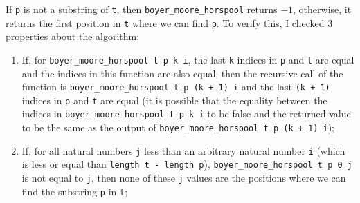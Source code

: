 If \texttt{p} is not a substring of \texttt{t}, then \texttt{boyer\_moore\_horspool} returns \(-1\), otherwise, it returns the first position in \texttt{t} where we can find \texttt{p}. To verify this, I checked \(3\) properties about the algorithm:
\begin{enumerate}
\item If, for \texttt{boyer\_moore\_horspool t p k i}, the last \texttt{k} indices in \texttt{p} and \texttt{t} are equal and the indices in this function are also equal, then the recursive call of the function is \texttt{boyer\_moore\_horspool t p (k + 1) i} and the last \texttt{(k + 1)} indices in \texttt{p} and \texttt{t} are equal (it is possible that the equality between the indices in \texttt{boyer\_moore\_horspool t p k i} to be false and the returned value to be the same as the output of \texttt{boyer\_moore\_horspool t p (k + 1) i});
\item If, for all natural numbers \texttt{j} less than an arbitrary natural number \texttt{i} (which is less or equal than \texttt{length t - length p}), \texttt{boyer\_moore\_horspool t p 0 j} is not equal to \texttt{j}, then none of these \texttt{j} values are the positions where we can find the substring \texttt{p} in \texttt{t};

\end{enumerate}
